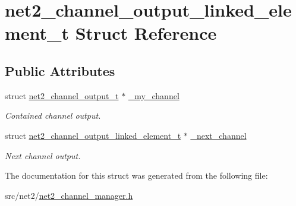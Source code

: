 \hypertarget{structnet2__channel__output__linked__element__t}{}\section{net2\+\_\+channel\+\_\+output\+\_\+linked\+\_\+element\+\_\+t Struct Reference}
\label{structnet2__channel__output__linked__element__t}
\subsection*{Public Attributes}
\begin{DoxyCompactItemize}
\item 
\hypertarget{structnet2__channel__output__linked__element__t_a343a53b3f9c63bb64b2d478421aae3cf}{}struct \hyperlink{structnet2__channel__output__t}{net2\+\_\+channel\+\_\+output\+\_\+t} $\ast$ \hyperlink{structnet2__channel__output__linked__element__t_a343a53b3f9c63bb64b2d478421aae3cf}{\+\_\+my\+\_\+channel}\label{structnet2__channel__output__linked__element__t_a343a53b3f9c63bb64b2d478421aae3cf}

\begin{DoxyCompactList}\small\item\em Contained channel output. \end{DoxyCompactList}\item 
\hypertarget{structnet2__channel__output__linked__element__t_a433cc35e25167e850e0d04c222b75a44}{}struct \hyperlink{structnet2__channel__output__linked__element__t}{net2\+\_\+channel\+\_\+output\+\_\+linked\+\_\+element\+\_\+t} $\ast$ \hyperlink{structnet2__channel__output__linked__element__t_a433cc35e25167e850e0d04c222b75a44}{\+\_\+next\+\_\+channel}\label{structnet2__channel__output__linked__element__t_a433cc35e25167e850e0d04c222b75a44}

\begin{DoxyCompactList}\small\item\em Next channel output. \end{DoxyCompactList}\end{DoxyCompactItemize}


The documentation for this struct was generated from the following file\+:\begin{DoxyCompactItemize}
\item 
src/net2/\hyperlink{net2__channel__manager_8h}{net2\+\_\+channel\+\_\+manager.\+h}\end{DoxyCompactItemize}
